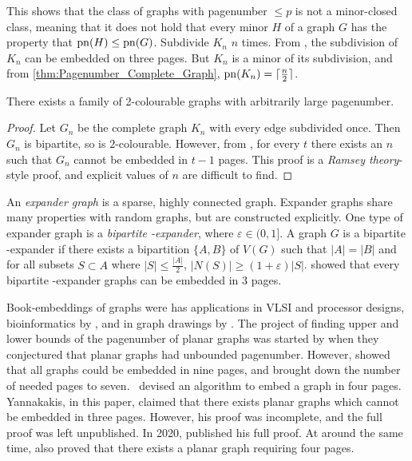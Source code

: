 This shows that the class of graphs with pagenumber $\leq p$ is not a minor-closed class, meaning that it does not hold that every minor $H$ of a graph $G$ has the property that $\operatorname{pn}(H) \leq \operatorname{pn}(G)$. 
Subdivide $K_n$ $n$ times. From \textcite{atneosenEmbeddabilityCompactaNbooks}, the subdivision of $K_n$ can be embedded on three pages. But $K_n$ is a minor of its subdivision, and from \cref{thm:Pagenumber_Complete_Graph}, $\operatorname{pn}(K_n) = \lceil \frac{n}{2} \rceil$. 

\begin{theorem}
	There exists a family of 2-colourable graphs with arbitrarily large pagenumber.
\end{theorem}
\begin{proof}
	Let $G_n$ be the complete graph $K_n$ with every edge subdivided once. Then $G_n$ is bipartite, so is $2$-colourable. However, from \textcite{eppsteinSeparatingThicknessGeometric2002}, for every $t$ there exists an $n$ such that $G_n$ cannot be embedded in $t-1$ pages. This proof is a \textit{Ramsey theory}-style proof, and explicit values of $n$ are difficult to find. 
\end{proof}

An \textit{expander graph} is a sparse, highly connected graph. Expander graphs share many properties with random graphs, but are constructed explicitly. One type of expander graph is a \textit{bipartite \varepsilon-expander}, where $\varepsilon \in (0, 1]$. A graph $G$ is a bipartite \varepsilon-expander if there exists a bipartition $ \{A, B\}$ of $V(G)$ such that $|A| = |B|$ and for all subsets $S \subset A$ where $|S| \leq \frac{|A|}{2}$, $|N(S)| \geq (1 + \varepsilon) |S|$. 
\textcite{dujmovicLayoutsExpanderGraphs2016} showed that every bipartite \varepsilon-expander graphs can be embedded in 3 pages. 


Book-embeddings of graphs were has applications in VLSI and processor designs, bioinformatics by \textcite{haslingerRNAStructuresPseudoknots1999}, and in graph drawings by \textcite{woodBoundedDegreeBook2002}. 
The project of finding upper and lower bounds of the pagenumber of planar graphs was started by \textcite{bernhartBookThicknessGraph1979} when they conjectured that planar graphs had unbounded pagenumber. However, \textcite{bussPagenumberPlanarGraphs1984} showed that all graphs could be embedded in nine pages, and \textcite{heathEmbeddingPlanarGraphs1984} brought down the number of needed pages to seven.\ \textcite{yannakakisEmbeddingPlanarGraphs1989} devised an algorithm to embed a graph in four pages. Yannakakis, in this paper, claimed that there exists planar graphs which cannot be embedded in three pages. However, his proof was incomplete, and the full proof was left unpublished. In 2020, \textcite{yannakakisPlanarGraphsThat2020} published his full proof. At around the same time, \textcite{kaufmannFourPagesAre2020} also proved that there exists a planar graph requiring four pages.

